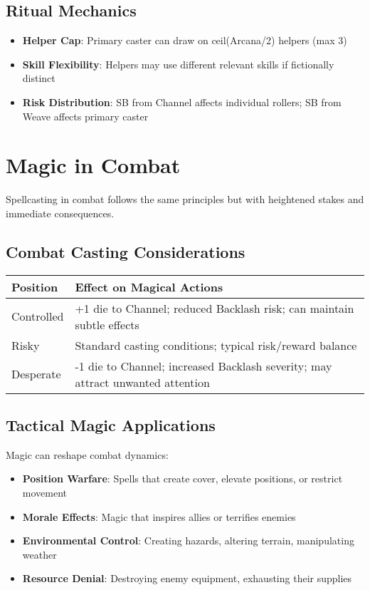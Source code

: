 \subsection*{Ritual Mechanics}

\begin{itemize}
    \item \textbf{Helper Cap}: Primary caster can draw on ceil(Arcana/2) helpers (max 3)
    \item \textbf{Skill Flexibility}: Helpers may use different relevant skills if fictionally distinct
    \item \textbf{Risk Distribution}: SB from Channel affects individual rollers; SB from Weave affects primary caster
\end{itemize}

\section*{Magic in Combat}

Spellcasting in combat follows the same principles but with heightened stakes and immediate consequences.

\subsection*{Combat Casting Considerations}

\begin{fatebox}
\begin{tabularx}{\textwidth}{lX}
\toprule
\textbf{Position} & \textbf{Effect on Magical Actions} \\
\midrule
Controlled & +1 die to Channel; reduced Backlash risk; can maintain subtle effects \\
Risky & Standard casting conditions; typical risk/reward balance \\
Desperate & -1 die to Channel; increased Backlash severity; may attract unwanted attention \\
\bottomrule
\end{tabularx}
\end{fatebox}

\subsection*{Tactical Magic Applications}

Magic can reshape combat dynamics:
\begin{itemize}
    \item \textbf{Position Warfare}: Spells that create cover, elevate positions, or restrict movement
    \item \textbf{Morale Effects}: Magic that inspires allies or terrifies enemies
    \item \textbf{Environmental Control}: Creating hazards, altering terrain, manipulating weather
    \item \textbf{Resource Denial}: Destroying enemy equipment, exhausting their supplies
\end{itemize}

